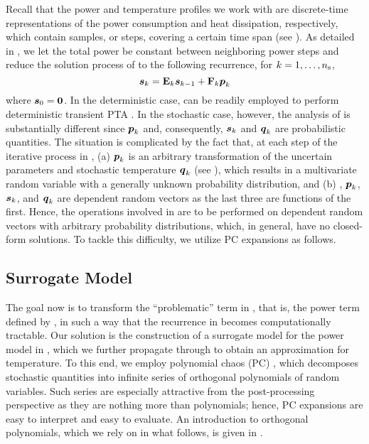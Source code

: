 Recall that the power and temperature profiles we work with are discrete-time
representations of the power consumption and heat dissipation, respectively,
which contain \ns samples, or steps, covering a certain time span (see
). As detailed in , we let the
total power be constant between neighboring power steps and reduce the solution
process of  to the following recurrence, for $k =
1, \dots, {n_\mathrm{s}}$,
\[
  \boldsymbol{s}_k = \mathbf{E}_k \boldsymbol{s}_{k - 1} + \mathbf{F}_k \boldsymbol{p}_k
\]
where $\boldsymbol{s}_0 = \boldsymbol{0}$. In the deterministic case,  can be
readily employed to perform deterministic transient PTA \cite{thiele2011,
ukhov2012}. In the stochastic case, however, the analysis of 
is substantially different since $\boldsymbol{p}_k$ and, consequently, $\boldsymbol{s}_k$ and $\boldsymbol{q}_k$
are probabilistic quantities. The situation is complicated by the fact that, at
each step of the iterative process in , (a) $\boldsymbol{p}_k$ is an
arbitrary transformation of the uncertain parameters \vu and stochastic
temperature $\boldsymbol{q}_k$ (see ), which results in a multivariate
random variable with a generally unknown probability distribution, and (b) \vu,
$\boldsymbol{p}_k$, $\boldsymbol{s}_k$, and $\boldsymbol{q}_k$ are dependent random vectors as the last three are
functions of the first. Hence, the operations involved in  are
to be performed on dependent random vectors with arbitrary probability
distributions, which, in general, have no closed-form solutions. To tackle this
difficulty, we utilize PC expansions as follows.

\subsection{Surrogate Model}

The goal now is to transform the ``problematic'' term in , that
is, the power term defined by , in such a way that the
recurrence in  becomes computationally tractable. Our solution
is the construction of a surrogate model for the power model in
, which we further propagate through  to
obtain an approximation for temperature. To this end, we employ polynomial chaos
(PC) \cite{xiu2010}, which decomposes stochastic quantities into infinite series
of orthogonal polynomials of random variables. Such series are especially
attractive from the post-processing perspective as they are nothing more than
polynomials; hence, PC expansions are easy to interpret and easy to evaluate. An
introduction to orthogonal polynomials, which we rely on in what follows, is
given in .

